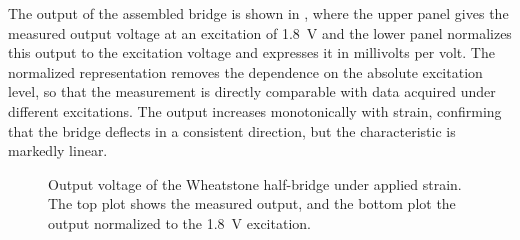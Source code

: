 The output of the assembled bridge is shown in , where the upper panel gives the measured output voltage at an excitation of \SI{1.8}{\volt} and the lower panel normalizes this output to the excitation voltage and expresses it in millivolts per volt. The normalized representation removes the dependence on the absolute excitation level, so that the measurement is directly comparable with data acquired under different excitations. The output increases monotonically with strain, confirming that the bridge deflects in a consistent direction, but the characteristic is markedly linear. 

\begin{figure}[!t]
\centering

    \caption{Output voltage of the Wheatstone half-bridge under applied strain. The top plot shows the measured output, and the bottom plot the output normalized to the \SI{1.8}{\volt} excitation.}
    \label{fig:Wheatstone1}
\end{figure}
